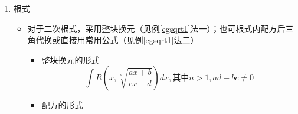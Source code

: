 \begin{enumerate}
\begin{example}
\begin{equation*}
\begin{aligned}
			&\xlongequal{t=\tan x} 2\int \frac{1+t^2}{6t^2+4}\frac{1}{1+t^2}\,dt\qquad\mbox{换元，记得微分也要变}\\
			&= \int \frac{dt}{3t^2+2}\qquad\mbox{化为分式型}\\
			&= \cdots
		\end{aligned}
		\end{equation*}
		注；本题分母若变为$3-\cos^2 x$没什么作用，故应先考虑倍角公式，实现降幂
	\end{example}
	\begin{example}
		\label{eg4}
		三角函数相乘怎么玩，请见此题分解
		\begin{equation*}
		\begin{aligned}
			\int \tan(x+a)\tan(x+b)dx&= \int \frac{\sin(x+a)\sin(x+b)}{\cos(x+a)\cos(x+b)}dx\qquad\mbox{切化弦}\\
			&= \int (\frac{\sin(x+a)\sin(x+b)+\cos(x+a)\cos(x+b)}{\cos(x+a)\cos(x+b)}-1)dx\\
			&\qquad\mbox{加一项减一项，目标消}x\\
			&= \int (\frac{\cos(a-b)}{\cos(x+a)\cos(x+b)}-1)dx\qquad\mbox{用和差角公式进行合并}\\
			&= -x+\cos(a-b)\int \frac{\sin((a+x)-(b+x))dx}{\sin(a-b)\cos(x+a)\cos(x+b)}\qquad\mbox{同乘}\sin(a-b)\\
			&= -x+\cot(a-b)\int \frac{\sin(x+a)\cos(x+b)-\cos(x+a)\sin(x+b)dx}{\cos(x+a)\cos(x+b)}\qquad\mbox{拆开}\\
			&= -x+\cot(a-b)-\int (\tan(x+a)-\tan(x+b))dx\\
			&= -x+\cot(a-b)-\ln\left|\frac{\cos(x+a)}{\cos(x+b)}\right|+C
		\end{aligned}
		\end{equation*}
		注：同乘的部分我们采用了$\sin(a-b)$而不是$\cos(a-b)$，因$\sin (x+y)$拆分后有交叉的$\sin x\cos y$项，可以与分母相消. 同样的方法可计算$\displaystyle\int\frac{dx}{\sin(x+a)\sin(x+b)}$，$\displaystyle\int\frac{dx}{\cos(x+a)\cos(x+b)}$等等，留给读者做练习
	\end{example}
	\item 根式
	\begin{itemize}
		\item 对于二次根式，采用整块换元（见例\ref{egsqrt1}法一）；也可根式内配方后三角代换或直接用常用公式（见例\ref{egsqrt1}法二）
		\begin{itemize}
			\item[*] 整块换元的形式
			\[\int R\left(x,\sqrt[n]{\frac{ax+b}{cx+d}}\right)dx,\mbox{其中}n>1,ad-bc\ne 0\]
			\item[*] 配方的形式

\end{itemize}
\end{itemize}
\end{enumerate}
